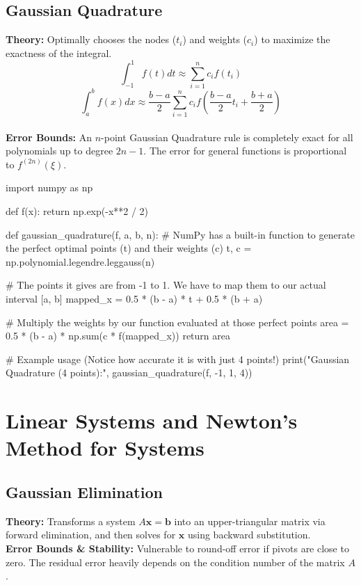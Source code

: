 \documentclass{article}
\begin{document}
\subsection{Gaussian Quadrature}
\textbf{Theory:} Optimally chooses the nodes ($t_i$) and weights ($c_i$) to maximize the exactness of the integral.
$$ \int_{-1}^1 f(t) dt \approx \sum_{i=1}^n c_i f(t_i) $$
$$ \int_a^b f(x) dx \approx \frac{b-a}{2} \sum_{i=1}^n c_i f\left( \frac{b-a}{2}t_i + \frac{b+a}{2} \right) $$ \\
\textbf{Error Bounds:} An $n$-point Gaussian Quadrature rule is completely exact for all polynomials up to degree $2n - 1$. The error for general functions is proportional to $f^{(2n)}(\xi)$.

\begin{jupytercode}
import numpy as np

def f(x):
    return np.exp(-x**2 / 2)

def gaussian_quadrature(f, a, b, n):
    # NumPy has a built-in function to generate the perfect optimal points (t) and their weights (c)
    t, c = np.polynomial.legendre.leggauss(n)
    
    # The points it gives are from -1 to 1. We have to map them to our actual interval [a, b]
    mapped_x = 0.5 * (b - a) * t + 0.5 * (b + a)
    
    # Multiply the weights by our function evaluated at those perfect points
    area = 0.5 * (b - a) * np.sum(c * f(mapped_x))
    return area

# Example usage (Notice how accurate it is with just 4 points!)
print("Gaussian Quadrature (4 points):", gaussian_quadrature(f, -1, 1, 4))
\end{jupytercode}
\newpage


\section{Linear Systems and Newton's Method for Systems}

\subsection{Gaussian Elimination}
\textbf{Theory:} Transforms a system $A\mathbf{x} = \mathbf{b}$ into an upper-triangular matrix via forward elimination, and then solves for $\mathbf{x}$ using backward substitution. \\
\textbf{Error Bounds \& Stability:} Vulnerable to round-off error if pivots are close to zero. The residual error heavily depends on the condition number of the matrix $A$.
\end{document}
